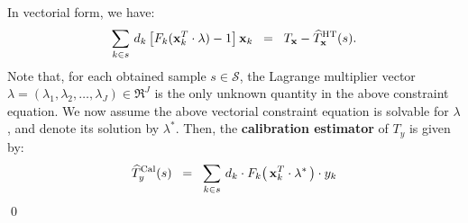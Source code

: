 \documentclass{article}
\begin{document}
In vectorial form, we have:
\begin{equation*}
\sum_{k \in s}\,d_{k}\left[F_{k}(\mathbf{x}_{k}^{T}\cdot\lambda) - 1\right] \mathbf{x}_{k}
\;\;=\;\; T_{\mathbf{x}} - \widehat{T}^{\textnormal{HT}}_{\mathbf{x}}(s).
\end{equation*}
Note that, for each obtained sample $s \in \mathcal{S}$, the Lagrange multiplier vector
$\lambda = (\lambda_{1},\lambda_{2},\ldots,\lambda_{J}) \in \Re^{J}$
is the only unknown quantity in the above constraint equation.
{\color{red}We now assume the above vectorial constraint equation is solvable for $\lambda$},
and denote its solution by $\lambda^{*}$.
Then, the \textbf{calibration estimator} of $T_{y}$ is given by:
\begin{equation*}
\widehat{T}^{\textnormal{Cal}}_{y}(s)
\;\;=\;\;
\sum_{k \in s}\,d_{k}\cdot F_{k}\!\left(\,\mathbf{x}_{k}^{T}\cdot\lambda^{*}\,\right)\cdot y_{k}
\end{equation*}
\qed


%
%
%



\end{document}
